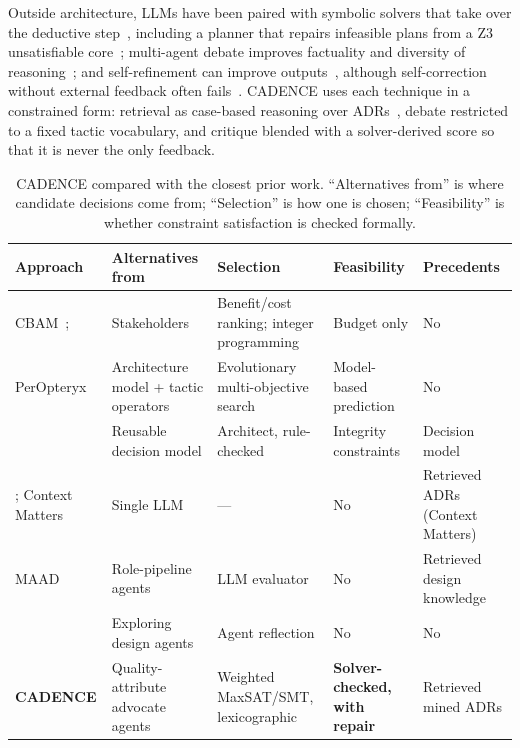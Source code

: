 \documentclass[preprint,12pt,authoryear]{elsarticle}
\renewcommand{\_}{\textunderscore\allowbreak{}}
\begin{document}
Outside architecture, LLMs have been paired with symbolic solvers that take over the deductive step~\citep{pan2023logiclm,olausson2023linc,szeider2025mcpsolver}, including a planner that repairs infeasible plans from a Z3 unsatisfiable core~\citep{hao2024planningz3}; multi-agent debate improves factuality and diversity of reasoning~\citep{duetal2023debate,liang2024divergent,chan2024chateval}; and self-refinement can improve outputs~\citep{madaan2023selfrefine,shinn2023reflexion}, although self-correction without external feedback often fails~\citep{huang2024selfcorrect}. CADENCE uses each technique in a constrained form: retrieval as case-based reasoning over ADRs~\citep{lewis2020rag,hatalis2025cbrllm,wiratunga2024cbrrag}, debate restricted to a fixed tactic vocabulary, and critique blended with a solver-derived score so that it is never the only feedback.

\begin{table}[!htbp]
\caption{CADENCE compared with the closest prior work. ``Alternatives from'' is where candidate decisions come from; ``Selection'' is how one is chosen; ``Feasibility'' is whether constraint satisfaction is checked formally.\label{tab:relatedwork}}
\centering
\footnotesize
\setlength{\tabcolsep}{3pt}
\begin{tabular}{@{}>{\raggedright\arraybackslash}p{1.15in}>{\raggedright\arraybackslash}p{1.15in}>{\raggedright\arraybackslash}p{1.2in}>{\raggedright\arraybackslash}p{0.75in}>{\raggedright\arraybackslash}p{0.75in}@{}}
\toprule
Approach & Alternatives from & Selection & Feasibility & Precedents \\
\midrule
CBAM~\citep{kazman2001cbam}; \citet{alnaeem2005} & Stakeholders & Benefit/cost ranking; integer programming & Budget only & No \\
PerOpteryx~\citep{koziolek2011peropteryx} & Architecture model + tactic operators & Evolutionary multi-objective search & Model-based prediction & No \\
\citet{zimmermann2009} & Reusable decision model & Architect, rule-checked & Integrity constraints & Decision model \\
\citet{dhar2024llm}; Context Matters~\citep{contextmatters2026} & Single LLM & --- & No & Retrieved ADRs (Context Matters) \\
MAAD~\citep{zhang2025maad,maad2025} & Role-pipeline agents & LLM evaluator & No & Retrieved design knowledge \\
\citet{diazpace2025} & Exploring design agents & Agent reflection & No & No \\
\textbf{CADENCE} & Quality-attribute advocate agents & Weighted MaxSAT/SMT, lexicographic & \textbf{Solver-checked, with repair} & Retrieved mined ADRs \\
\bottomrule
\end{tabular}
\end{table}
\FloatBarrier
\end{document}
